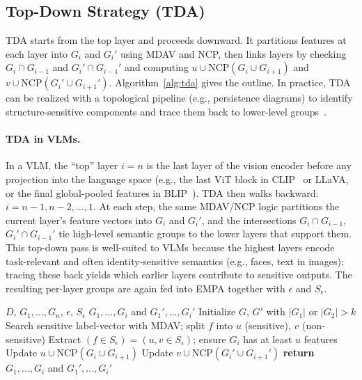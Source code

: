 \documentclass[journal,transmag]{IEEEtran}
\begin{document}
\subsection{Top-Down Strategy (TDA)}
\label{subsec:tda}

TDA starts from the top layer and proceeds downward. It partitions features at each layer into $G_i$ and $G_i'$ using MDAV and NCP, then links layers by checking $G_i \cap G_{i-1}$ and $G_i' \cap G_{i-1}'$ and computing $u \cup \mathrm{NCP}(G_i \cup G_{i+1})$ and $v \cup \mathrm{NCP}(G_i' \cup G_{i+1}')$. Algorithm~\ref{alg:tda} gives the outline. In practice, TDA can be realized with a topological pipeline (e.g., persistence diagrams) to identify structure-sensitive components and trace them back to lower-level groups~\cite{lin2017feature}.

\paragraph{TDA in VLMs.}
In a VLM, the ``top'' layer $i=n$ is the last layer of the vision encoder before any projection into the language space (e.g., the last ViT block in CLIP~\cite{radford2021learning} or LLaVA, or the final global-pooled features in BLIP~\cite{li2022blip}). TDA then walks backward: $i=n-1,n-2,\ldots,1$. At each step, the same MDAV/NCP logic partitions the current layer's feature vectors into $G_i$ and $G_i'$, and the intersections $G_i \cap G_{i-1}$, $G_i' \cap G_{i-1}'$ tie high-level semantic groups to the lower layers that support them. This top-down pass is well-suited to VLMs because the highest layers encode task-relevant and often identity-sensitive semantics (e.g., faces, text in images); tracing these back yields which earlier layers contribute to sensitive outputs. The resulting per-layer groups are again fed into EMPA together with $\epsilon$ and $S_\epsilon$.

\begin{algorithm}[t]
\caption{Top-Down Strategy (TDA)}
\label{alg:tda}
\begin{algorithmic}[1]
\REQUIRE $D$, $G_1,\ldots,G_n$, $\epsilon$, $S_\epsilon$
\ENSURE $G_1,\ldots,G_i$ and $G_1',\ldots,G_i'$
\STATE Initialize $G$, $G'$ with $|G_1|$ or $|G_2| > k$
    \STATE Search sensitive label-vector with MDAV; split $f$ into $u$ (sensitive), $v$ (non-sensitive)
    \STATE Extract $(f \in S_\epsilon) = (u,v \in S_\epsilon)$; ensure $G_i$ has at least $u$ features
  \ENDFOR
\ENDFOR
{}
   \STATE Update $u \cup \mathrm{NCP}(G_i \cup G_{i+1})$
  \ENDIF
   \STATE Update $v \cup \mathrm{NCP}(G_i' \cup G_{i+1}')$
  \ENDIF
\ENDFOR
\STATE \textbf{return} $G_1,\ldots,G_i$ and $G_1',\ldots,G_i'$
\end{algorithmic}
\end{algorithm}
\end{document}
